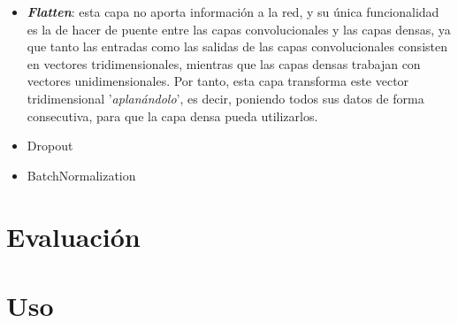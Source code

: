 \documentclass{uc3mpracticas}
\begin{document}
  \begin{itemize}
    \item \textbf{\textit{Flatten}}: esta capa no aporta información a la red, y su única funcionalidad es la de hacer de puente entre las capas convolucionales y las capas densas, ya que tanto las entradas como las salidas de las capas convolucionales consisten en vectores tridimensionales, mientras que las capas densas trabajan con vectores unidimensionales. Por tanto, esta capa transforma este vector tridimensional '\textit{aplanándolo}', es decir, poniendo todos sus datos de forma consecutiva, para que la capa densa pueda utilizarlos.
    \item Dropout

    \item BatchNormalization
  \end{itemize}



  \newpage

  \section{Evaluación}

  \newpage
  \section{Uso}
\end{document}
